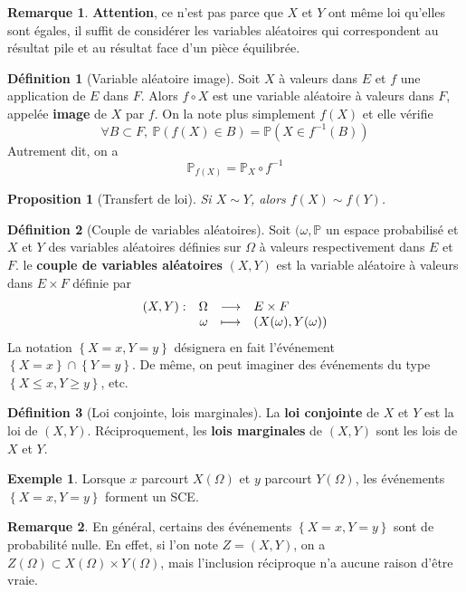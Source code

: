 \documentclass[french]{book}
\renewcommand{\P}{\mathbb{P}}
\newcommand{\inv}{^{-1}}
\theoremstyle{plain}
\newtheorem{prop}{Proposition}[chapter]
\theoremstyle{definition}
\newtheorem{dfn}{Définition}[chapter]
\newtheorem{exa}{Exemple}[chapter]
\newtheorem{rmq}{Remarque}[chapter]
\theoremstyle{remark}
\begin{document}
\begin{rmq} \textbf{Attention}, ce n'est pas parce que $X$ et $Y$ ont même loi qu'elles sont égales, il suffit de considérer les variables aléatoires qui correspondent au résultat pile et au résultat face d'un pièce équilibrée. \end{rmq}
\begin{dfn}[Variable aléatoire image]
	Soit $X$ à valeurs dans $E$ et $f$ une application de $E$ dans $F$. Alors $f\circ X$ est une variable aléatoire à valeurs dans $F$, appelée \textbf{image} de $X$ par $f$. On la note plus simplement $f(X)$ et elle vérifie $$\forall B\subset F, \ \P(f(X)\in B)=\P(X\in f\inv(B))$$ Autrement dit, on a $$\P_{f(X)}=\P_X\circ f\inv$$
\end{dfn}
\begin{prop}[Transfert de loi]
	Si $X\sim Y$, alors $f(X)\sim f(Y)$.
\end{prop}
\begin{dfn}[Couple de variables aléatoires]
	Soit $(\omega,\P$ un espace probabilisé et $X$ et $Y$ des variables aléatoires définies sur $\Omega$ à valeurs respectivement dans $E$ et $F$. le \textbf{couple de variables aléatoires} $(X,Y)$ est la variable aléatoire à valeurs dans $E\times F$ définie par 
	$$
	\begin{array}[t]{lrcl}
		(X,Y) : & \Omega & \longrightarrow & E\times F \\
		& \omega & \longmapsto & (X(\omega),Y(\omega))
	\end{array}
	$$ La notation $\left\{X=x,Y=y\right\}$ désignera en fait l'événement $\left\{X=x\right\}\cap\left\{Y=y\right\}$. De même, on peut imaginer des événements du type $\left\{X\leqslant x, Y\geqslant y\right\}$, etc.
\end{dfn}
\begin{dfn}[Loi conjointe, lois marginales]
	La \textbf{loi conjointe} de $X$ et $Y$ est la loi de $(X,Y)$. Réciproquement, les \textbf{lois marginales} de $(X,Y)$ sont les lois de $X$ et $Y$.
\end{dfn}
\begin{exa}
	Lorsque $x$ parcourt $X(\Omega)$ et $y$ parcourt $Y(\Omega)$, les événements $\left\{X=x,Y=y\right\}$ forment un SCE.
\end{exa}
\begin{rmq} En général, certains des événements $\left\{X=x,Y=y\right\}$ sont de probabilité nulle. En effet, si l'on note $Z=(X,Y)$, on a $Z(\Omega)\subset X(\Omega)\times Y(\Omega)$, mais l'inclusion réciproque n'a aucune raison d'être vraie. \end{rmq}
\end{document}
